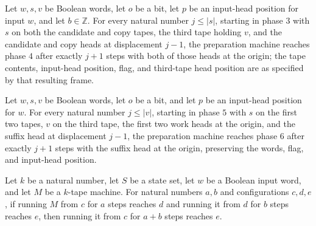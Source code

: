 \begin{lemma}
\label{Turing.FinTM.emitterP2_prepare_rewind_candidate}
\leanok
{}
Let $w,s,v$ be Boolean words, let $o$ be a bit, let $p$ be an input-head position for
input $w$, and let $b\in\mathbb{Z}$. For every natural number $j\le |s|$, starting in
phase $3$ with $s$ on both the candidate and copy tapes, the third tape holding $v$, and
the candidate and copy heads at displacement $j-1$, the preparation machine reaches
phase $4$ after exactly $j+1$ steps with both of those heads at the origin; the tape
contents, input-head position, flag, and third-tape head position are as specified by
that resulting frame.
\end{lemma}

\begin{lemma}
\label{Turing.FinTM.emitterP2_prepare_rewind_suffix}
\leanok
{}
Let $w,s,v$ be Boolean words, let $o$ be a bit, and let $p$ be an input-head position
for $w$. For every natural number $j\le |v|$, starting in phase $5$ with $s$ on the
first two tapes, $v$ on the third tape, the first two work heads at the origin, and the
suffix head at displacement $j-1$, the preparation machine reaches phase $6$ after
exactly $j+1$ steps with the suffix head at the origin, preserving the words, flag, and
input-head position.
\end{lemma}

\begin{lemma}
\label{Turing.FinTM.emitterP2_join}
\leanok
{}
Let $k$ be a natural number, let $S$ be a state set, let $w$ be a Boolean input word,
and let $M$ be a $k$-tape machine. For natural numbers $a,b$ and configurations $c,d,e$,
if running $M$ from $c$ for $a$ steps reaches $d$ and running it from $d$ for $b$ steps
reaches $e$, then running it from $c$ for $a+b$ steps reaches $e$.
\end{lemma}

